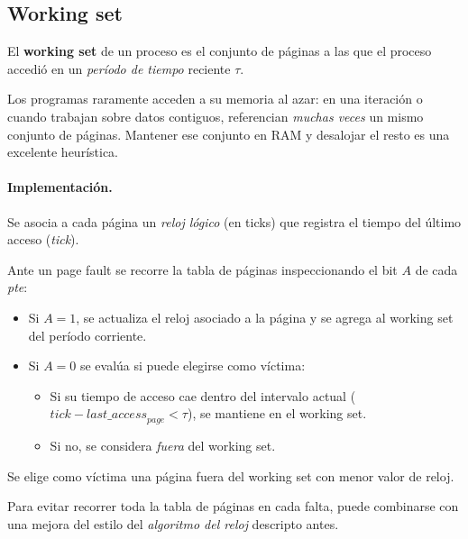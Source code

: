 \documentclass[11pt,a4paper]{article}
\begin{document}
\subsection{Working set}

\begin{definicion}
El \textbf{working set} de un proceso es el conjunto de páginas a las
que el proceso accedió en un \emph{período de tiempo} reciente $\tau$.
\end{definicion}

\begin{idea}
Los programas raramente acceden a su memoria al azar: en una iteración
o cuando trabajan sobre datos contiguos, referencian \emph{muchas
veces} un mismo conjunto de páginas. Mantener ese conjunto en RAM y
desalojar el resto es una excelente heurística.
\end{idea}

\paragraph{Implementación.}
Se asocia a cada página un \emph{reloj lógico} (en ticks) que registra
el tiempo del último acceso (\emph{tick}).

Ante un page fault se recorre la tabla de páginas inspeccionando el
bit $A$ de cada \emph{pte}:

\begin{itemize}[leftmargin=*]
    \item Si $A=1$, se actualiza el reloj asociado a la página y se
        agrega al working set del período corriente.
    \item Si $A=0$ se evalúa si puede elegirse como víctima:
        \begin{itemize}[leftmargin=*,nosep]
            \item Si su tiempo de acceso cae dentro del intervalo
                actual ($\textit{tick} - \textit{last\_access}_{\textit{page}} < \tau$),
                se mantiene en el working set.
            \item Si no, se considera \emph{fuera} del working set.
        \end{itemize}
\end{itemize}

Se elige como víctima una página fuera del working set con menor valor
de reloj.

Para evitar recorrer toda la tabla de páginas en cada falta, puede
combinarse con una mejora del estilo del \emph{algoritmo del reloj}
descripto antes.
\end{document}
